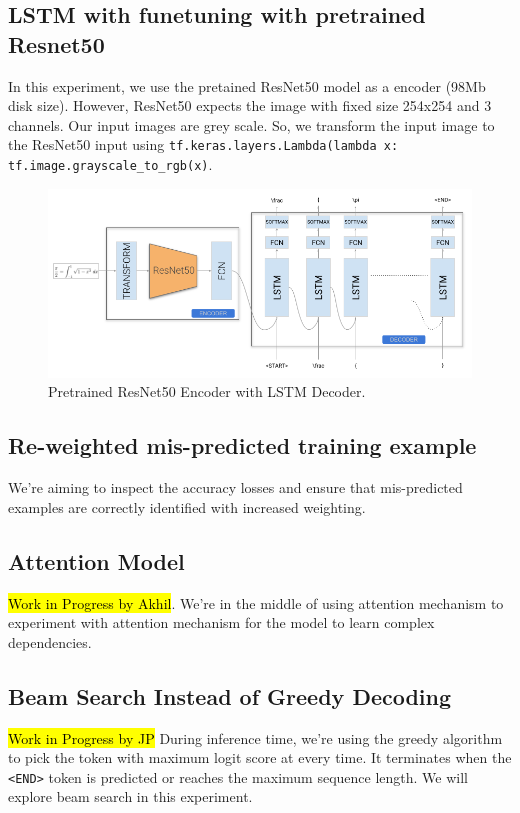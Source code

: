 \documentclass{article}
\newcommand{\hlblue}[1]{\hl{#1}}
\begin{document}
\subsection{LSTM with funetuning with pretrained Resnet50}

In this experiment, we use the pretained ResNet50 model as a encoder (98Mb disk size). However, ResNet50 expects the image with fixed size 254x254 and 3 channels. Our input images are grey scale. So, we transform the input image to the ResNet50 input using \verb|tf.keras.layers.Lambda(lambda x: tf.image.grayscale_to_rgb(x)|.

\begin{figure}[H]
    \centering
    \includegraphics[scale=0.42]{fig_resnet_LSTM.png}
    \caption{Pretrained ResNet50 Encoder with LSTM Decoder.}
    \label{fig:resnet_lstm}
\end{figure}

\subsection{Re-weighted mis-predicted training example}
 
  We're aiming to inspect the accuracy losses and ensure that mis-predicted examples are correctly identified with increased weighting. 

\subsection{Attention Model}
   \hlblue{Work in Progress by Akhil}. We're in the middle of using attention mechanism to experiment with attention mechanism for the model to learn complex dependencies. 
  
\subsection{Beam Search Instead of Greedy Decoding}
  \hlblue{Work in Progress by JP} During inference time, we're using the greedy algorithm to pick the token with maximum logit score at every time. It terminates when the \verb|<END>| token is predicted or reaches the maximum sequence length. We will explore beam search in this experiment.
\end{document}
